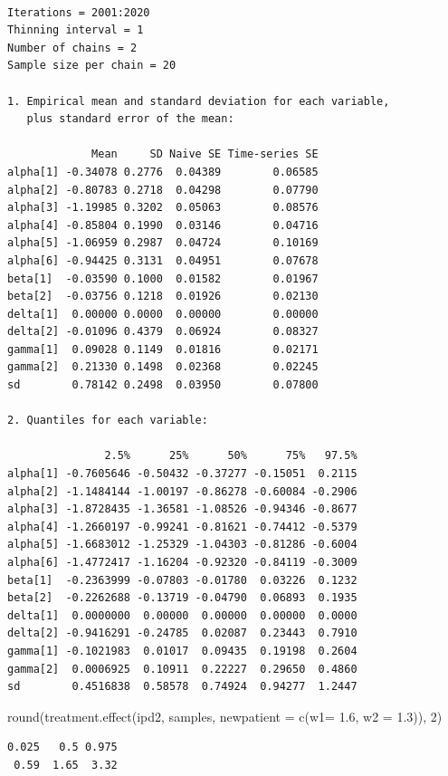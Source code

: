 \documentclass[
  letterpaper,
  DIV=11,
  numbers=noendperiod]{scrreprt}
\newenvironment{Shaded}{\begin{snugshade}}{\end{snugshade}}
\newcommand{\AttributeTok}[1]{\textcolor[rgb]{0.40,0.45,0.13}{#1}}
\newcommand{\DecValTok}[1]{\textcolor[rgb]{0.68,0.00,0.00}{#1}}
\newcommand{\FloatTok}[1]{\textcolor[rgb]{0.68,0.00,0.00}{#1}}
\newcommand{\FunctionTok}[1]{\textcolor[rgb]{0.28,0.35,0.67}{#1}}
\newcommand{\NormalTok}[1]{\textcolor[rgb]{0.00,0.23,0.31}{#1}}
\begin{document}
\begin{verbatim}

Iterations = 2001:2020
Thinning interval = 1 
Number of chains = 2 
Sample size per chain = 20 

1. Empirical mean and standard deviation for each variable,
   plus standard error of the mean:

             Mean     SD Naive SE Time-series SE
alpha[1] -0.34078 0.2776  0.04389        0.06585
alpha[2] -0.80783 0.2718  0.04298        0.07790
alpha[3] -1.19985 0.3202  0.05063        0.08576
alpha[4] -0.85804 0.1990  0.03146        0.04716
alpha[5] -1.06959 0.2987  0.04724        0.10169
alpha[6] -0.94425 0.3131  0.04951        0.07678
beta[1]  -0.03590 0.1000  0.01582        0.01967
beta[2]  -0.03756 0.1218  0.01926        0.02130
delta[1]  0.00000 0.0000  0.00000        0.00000
delta[2] -0.01096 0.4379  0.06924        0.08327
gamma[1]  0.09028 0.1149  0.01816        0.02171
gamma[2]  0.21330 0.1498  0.02368        0.02245
sd        0.78142 0.2498  0.03950        0.07800

2. Quantiles for each variable:

               2.5%      25%      50%      75%   97.5%
alpha[1] -0.7605646 -0.50432 -0.37277 -0.15051  0.2115
alpha[2] -1.1484144 -1.00197 -0.86278 -0.60084 -0.2906
alpha[3] -1.8728435 -1.36581 -1.08526 -0.94346 -0.8677
alpha[4] -1.2660197 -0.99241 -0.81621 -0.74412 -0.5379
alpha[5] -1.6683012 -1.25329 -1.04303 -0.81286 -0.6004
alpha[6] -1.4772417 -1.16204 -0.92320 -0.84119 -0.3009
beta[1]  -0.2363999 -0.07803 -0.01780  0.03226  0.1232
beta[2]  -0.2262688 -0.13719 -0.04790  0.06893  0.1935
delta[1]  0.0000000  0.00000  0.00000  0.00000  0.0000
delta[2] -0.9416291 -0.24785  0.02087  0.23443  0.7910
gamma[1] -0.1021983  0.01017  0.09435  0.19198  0.2604
gamma[2]  0.0006925  0.10911  0.22227  0.29650  0.4860
sd        0.4516838  0.58578  0.74924  0.94277  1.2447
\end{verbatim}

\begin{Shaded}
\begin{Highlighting}[]
\FunctionTok{round}\NormalTok{(}\FunctionTok{treatment.effect}\NormalTok{(ipd2, samples, }\AttributeTok{newpatient =} \FunctionTok{c}\NormalTok{(}\AttributeTok{w1=} \FloatTok{1.6}\NormalTok{, }\AttributeTok{w2 =} \FloatTok{1.3}\NormalTok{)), }\DecValTok{2}\NormalTok{)}
\end{Highlighting}
\end{Shaded}

\begin{verbatim}
0.025   0.5 0.975 
 0.59  1.65  3.32 
\end{verbatim}
\end{document}
